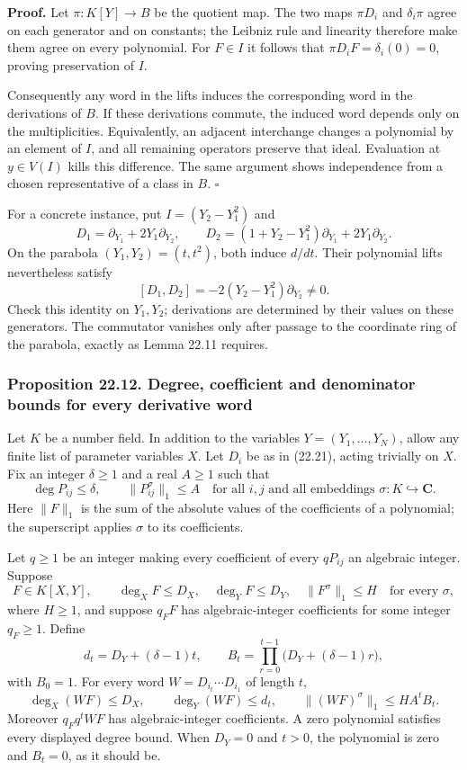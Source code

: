 \documentclass[
  11pt,
  a4paper,
]{article}
\begin{document}
\textbf{Proof.} Let \(\pi:K[Y]\to B\) be the quotient map. The two maps
\(\pi D_i\) and \(\delta_i\pi\) agree on each generator and on
constants; the Leibniz rule and linearity therefore make them agree on
every polynomial. For \(F\in I\) it follows that
\(\pi D_iF=\delta_i(0)=0\), proving preservation of \(I\).

Consequently any word in the lifts induces the corresponding word in the
derivations of \(B\). If these derivations commute, the induced word
depends only on the multiplicities. Equivalently, an adjacent
interchange changes a polynomial by an element of \(I\), and all
remaining operators preserve that ideal. Evaluation at \(y\in V(I)\)
kills this difference. The same argument shows independence from a
chosen representative of a class in \(B\). \(\square\)

For a concrete instance, put \(I=(Y_2-Y_1^2)\) and \[
 D_1=\partial_{Y_1}+2Y_1\partial_{Y_2},\qquad
 D_2=(1+Y_2-Y_1^2)\partial_{Y_1}+2Y_1\partial_{Y_2}.
\] On the parabola \((Y_1,Y_2)=(t,t^2)\), both induce \(d/dt\). Their
polynomial lifts nevertheless satisfy \[
 [D_1,D_2]=-2(Y_2-Y_1^2)\partial_{Y_2}\ne0.
\] Check this identity on \(Y_1,Y_2\); derivations are determined by
their values on these generators. The commutator vanishes only after
passage to the coordinate ring of the parabola, exactly as Lemma 22.11
requires.

\subsubsection{Proposition 22.12. Degree, coefficient and denominator
bounds for every derivative
word}\label{proposition-22.12.-degree-coefficient-and-denominator-bounds-for-every-derivative-word}

Let \(K\) be a number field. In addition to the variables
\(Y=(Y_1,\ldots,Y_N)\), allow any finite list of parameter variables
\(X\). Let \(D_i\) be as in (22.21), acting trivially on \(X\). Fix an
integer \(\delta\ge1\) and a real \(A\ge1\) such that \[
 \deg P_{ij}\le\delta,\qquad
 \|P_{ij}^{\sigma}\|_1\le A
 \quad\text{for all }i,j\text{ and all embeddings }\sigma:K\hookrightarrow\mathbf C.
 \tag{22.22}
\] Here \(\|F\|_1\) is the sum of the absolute values of the
coefficients of a polynomial; the superscript applies \(\sigma\) to its
coefficients.

Let \(q\ge1\) be an integer making every coefficient of every
\(qP_{ij}\) an algebraic integer. Suppose \[
 F\in K[X,Y],\qquad
 \deg_X F\le D_X,\quad \deg_Y F\le D_Y,\quad
 \|F^\sigma\|_1\le H\quad\text{for every }\sigma,
 \tag{22.23}
\] where \(H\ge1\), and suppose \(q_FF\) has algebraic-integer
coefficients for some integer \(q_F\ge1\). Define \[
 d_t=D_Y+(\delta-1)t,
 \qquad B_t=\prod_{r=0}^{t-1}\bigl(D_Y+(\delta-1)r\bigr),
 \tag{22.24}
\] with \(B_0=1\). For every word \(W=D_{i_t}\cdots D_{i_1}\) of length
\(t\), \[
 \deg_X(WF)\le D_X,\qquad \deg_Y(WF)\le d_t,
 \qquad \|(WF)^\sigma\|_1\le H A^t B_t.
 \tag{22.25}
\] Moreover \(q_Fq^tWF\) has algebraic-integer coefficients. A zero
polynomial satisfies every displayed degree bound. When \(D_Y=0\) and
\(t>0\), the polynomial is zero and \(B_t=0\), as it should be.
\end{document}
